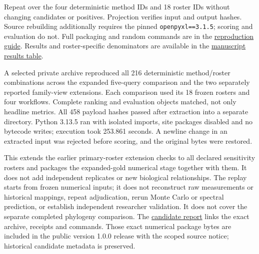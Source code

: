 \documentclass[
  10pt,
  a4paper,
]{article}
\begin{document}
Repeat over the four deterministic method IDs and 18 roster IDs without changing candidates or positives. Projection verifies input and output hashes. Source rebuilding additionally requires the pinned \texttt{openpyxl==3.1.5}; scoring and evaluation do not. Full packaging and random commands are in the \href{https://github.com/vinvomero/fungallink-benchmark/blob/main/docs/data/source-selected-gcf-analysis-v1.md}{reproduction guide}. Results and roster-specific denominators are available in the \href{https://github.com/vinvomero/fungallink-benchmark/blob/main/manuscript/initial-comparison-results-2026-10-07.tsv}{manuscript results table}.

A selected private archive reproduced all 216 deterministic method/roster combinations across the expanded five-query comparison and the two separately reported family-view extensions. Each comparison used its 18 frozen rosters and four workflows. Complete ranking and evaluation objects matched, not only headline metrics. All 458 payload hashes passed after extraction into a separate directory. Python 3.13.5 ran with isolated imports, site packages disabled and no bytecode writes; execution took 253.861 seconds. A newline change in an extracted input was rejected before scoring, and the original bytes were restored.

This extends the earlier primary-roster extension checks to all declared sensitivity rosters and packages the expanded-gold numerical stage together with them. It does not add independent replicates or new biological relationships. The replay starts from frozen numerical inputs; it does not reconstruct raw measurements or historical mappings, repeat adjudication, rerun Monte Carlo or spectral prediction, or establish independent researcher validation. It does not cover the separate completed phylogeny comparison. The \href{https://github.com/vinvomero/fungallink-benchmark/blob/main/docs/release/core-numerical-candidate-v1-2026-10-11.md}{candidate report} links the exact archive, receipts and commands. Those exact numerical package bytes are included in the public version 1.0.0 release with the scoped source notice; historical candidate metadata is preserved.
\end{document}
